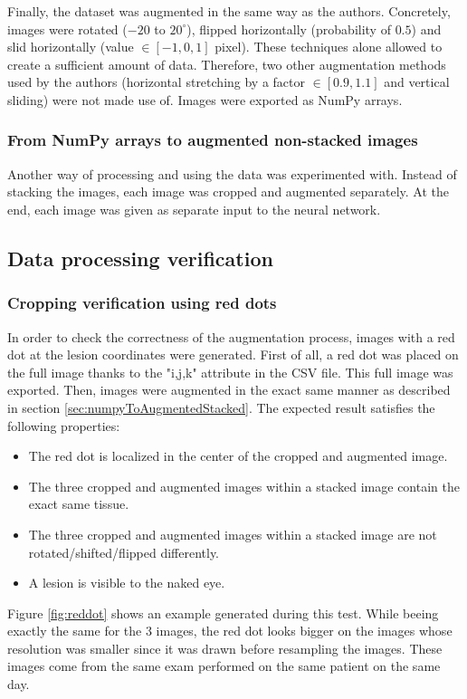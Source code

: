 Finally, the dataset was augmented in the same way as the authors. Concretely, images were rotated ($-20$ to $20^\circ$), flipped horizontally (probability of $0.5$) and slid horizontally (value $\in [-1, 0, 1]$ pixel). These techniques alone allowed to create a sufficient amount of data. Therefore, two other augmentation methods used by the authors (horizontal stretching by a factor $\in [0.9,1.1]$ and vertical sliding) were not made use of. Images were exported as NumPy arrays.


\subsubsection{From NumPy arrays to augmented non-stacked images}
Another way of processing and using the data was experimented with. Instead of stacking the images, each image was cropped and augmented separately. At the end, each image was given as separate input to the neural network. 


\subsection{Data processing verification}
\label{sec:dataProcessingVerification}

\subsubsection{Cropping verification using red dots}
In order to check the correctness of the augmentation process, images with a red dot at the lesion coordinates were generated. First of all, a red dot was placed on the full image thanks to the "i,j,k" attribute in the CSV file. This full image was exported. Then, images were augmented in the exact same manner as described in section \ref{sec:numpyToAugmentedStacked}. The expected result satisfies the following properties:
\begin{itemize}
	\item The red dot is localized in the center of the cropped and augmented image.
	\item The three cropped and augmented images within a stacked image contain the exact same tissue. 
	\item The three cropped and augmented images within a stacked image are not rotated/shifted/flipped differently. 
	\item A lesion is visible to the naked eye. 
\end{itemize}

\noindent Figure \ref{fig:reddot} shows an example generated during this test. While beeing exactly the same for the 3 images, the red dot looks bigger on the images whose resolution was smaller since it was drawn before resampling the images. These images come from the same exam performed on the same patient on the same day. 

